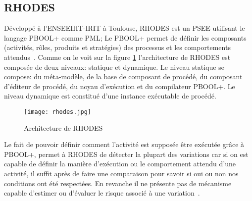 \subsection*{RHODES}
Développé à l'ENSEEIHT-IRIT à Toulouse, RHODES est un PSEE utilisant le langage PBOOL+ comme PML; Le PBOOL+ permet de définir les composants (activités, rôles, produits et stratégies) des processus et les comportements attendus~\cite{si}. 
Comme on le voit sur la figure \ref{rhodesArch} l'architecture de RHODES est composée de deux niveaux: statique et dynamique. Le niveau statique se compose: du méta-modèle, de la base de composant de procédé, du composant d'éditeur de procédé, du noyau d'exécution et du compilateur PBOOL+. Le niveau dynamique est constitué d'une instance exécutable de procédé.
\begin{figure}[h]
\centering
\texttt{[image: rhodes.jpg]}
\caption{\label{rhodesArch}Architecture de RHODES~\cite{si}}
\end{figure}
Le fait de pouvoir définir comment l'activité est supposée être exécutée grâce à PBOOL+, permet à RHODES de détecter la plupart des variations car si on est capable de définir la manière d'exécution ou le comportement attendu d'une activité, il suffit après de faire une comparaison pour savoir si oui ou non nos conditions ont été respectées. En revanche il ne présente pas de mécanisme capable d'estimer ou d'évaluer le risque associé à une variation~\cite{almRhodes}.
